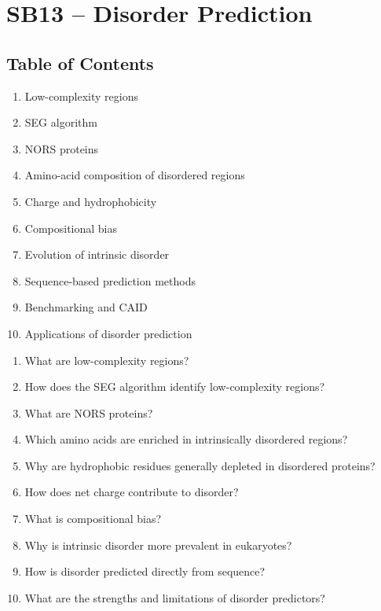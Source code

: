 \section{SB13 -- Disorder Prediction}

\subsection*{Table of Contents}

\begin{enumerate}
\item Low-complexity regions
\item SEG algorithm
\item NORS proteins
\item Amino-acid composition of disordered regions
\item Charge and hydrophobicity
\item Compositional bias
\item Evolution of intrinsic disorder
\item Sequence-based prediction methods
\item Benchmarking and CAID
\item Applications of disorder prediction
\end{enumerate}

\begin{enumerate}
\item{What are low-complexity regions?}
\item{How does the SEG algorithm identify low-complexity regions?}
\item{What are NORS proteins?}
\item{Which amino acids are enriched in intrinsically disordered regions?}
\item{Why are hydrophobic residues generally depleted in disordered proteins?}
\item{How does net charge contribute to disorder?}
\item{What is compositional bias?}
\item{Why is intrinsic disorder more prevalent in eukaryotes?}
\item{How is disorder predicted directly from sequence?}
\item{What are the strengths and limitations of disorder predictors?}
\end{enumerate}